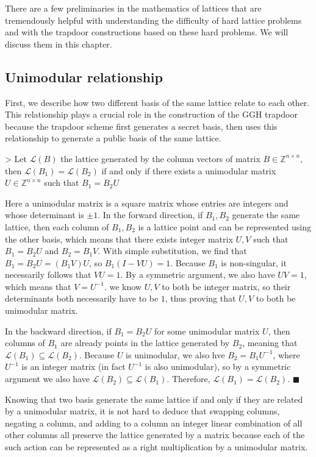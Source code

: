 \documentclass[letterpaper,12pt]{article}
\begin{document}
There are a few preliminaries in the mathematics of lattices that are tremendously helpful with understanding the difficulty of hard lattice problems and with the trapdoor constructions based on these hard problems. We will discuss them in this chapter.

\subsection{Unimodular relationship}
First, we describe how two different basis of the same lattice relate to each other. This relationship plays a crucial role in the construction of the GGH trapdoor because the trapdoor scheme first generates a secret basis, then uses this relationship to generate a public basis of the same lattice.

> Let $\mathcal{L}(B)$ the lattice generated by the column vectors of matrix $B \in \mathbb{Z}^{n \times n}$, then $\mathcal{L}(B_1) = \mathcal{L}(B_2)$ if and only if there exists a unimodular matrix $U \in \mathbb{Z}^{n \times n}$ such that $B_1 = B_2U$

Here a unimodular matrix is a square matrix whose entries are integers and whose determinant is $\pm 1$. In the forward direction, if $B_1, B_2$ generate the same lattice, then each column of $B_1, B_2$ is a lattice point and can be represented using the other basis, which means that there exists integer matrix $U, V$ such that $B_1 = B_2U$ and $B_2 = B_1V$. With simple substitution, we find that $B_1 = B_2U = (B_1V)U$, so $B_1(I - VU) = 1$. Because $B_1$ is non-singular, it necessarily follows that $VU = 1$. By a symmetric argument, we also have $UV = 1$, which means that $V = U^{-1}$. we know $U, V$ to both be integer matrix, so their determinants both necessarily have to be $1$, thus proving that $U, V$ to both be unimodular matrix.

In the backward direction, if $B_1 = B_2U$ for some unimodular matrix $U$, then columns of $B_1$ are already points in the lattice generated by $B_2$, meaning that $\mathcal{L}(B_1) \subseteq \mathcal{L}(B_2)$. Because $U$ is unimodular, we also hve $B_2 = B_1U^{-1}$, where $U^{-1}$ is an integer matrix (in fact $U^{-1}$ is also unimodular), so by a symmetric argument we also have $\mathcal{L}(B_2) \subseteq \mathcal{L}(B_1)$. Therefore, $\mathcal{L}(B_1) = \mathcal{L}(B_2)$. $\blacksquare$

Knowing that two basis generate the same lattice if and only if they are related by a unimodular matrix, it is not hard to deduce that swapping columns, negating a column, and adding to a column an integer linear combination of all other columns all preserve the lattice generated by a matrix because each of the such action can be represented as a right multiplication by a unimodular matrix.
\end{document}
